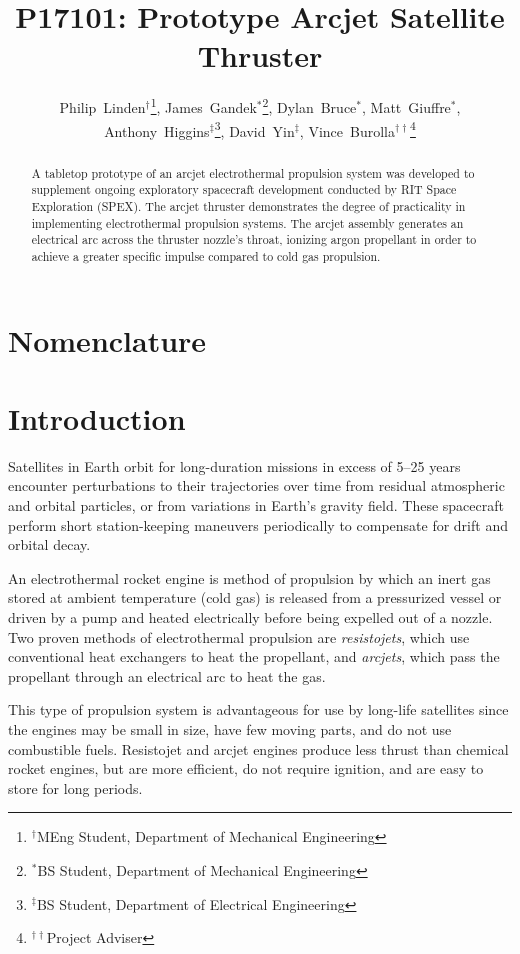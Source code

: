 \documentclass[journal]{IEEEtran}
\title{P17101: Prototype Arcjet Satellite Thruster}
\author{
  Philip~Linden$^{\dagger}$\thanks{$^{\dagger}$MEng Student, Department of Mechanical Engineering},
  James~Gandek$^{*}$\thanks{$^{*}$BS Student, Department of Mechanical Engineering},
  Dylan~Bruce$^{*}$,
  Matt~Giuffre$^{*}$,
  Anthony~Higgins$^{\ddagger}$\thanks{$^{\ddagger}$BS Student, Department of Electrical Engineering},
  David~Yin$^{\ddagger}$,
  Vince~Burolla$^{\dagger\dagger}$\thanks{$^{\dagger\dagger}$Project Adviser}
}
\begin{document}
\maketitle


\begin{abstract}
A tabletop prototype of an arcjet electrothermal propulsion system was developed to supplement ongoing exploratory spacecraft development conducted by RIT Space Exploration (SPEX). The arcjet thruster demonstrates the degree of practicality in implementing electrothermal propulsion systems. The arcjet assembly generates an electrical arc across the thruster nozzle's throat, ionizing argon propellant in order to achieve a greater specific impulse compared to cold gas propulsion.
\end{abstract}

\section{Nomenclature}
\label{sec:nomenclature}

\section{Introduction}
\label{sec:intro}
Satellites in Earth orbit for long-duration missions in excess of 5--25 years encounter perturbations to their trajectories over time from residual atmospheric and orbital particles, or from variations in Earth's gravity field.
These spacecraft perform short station-keeping maneuvers periodically to compensate for drift and orbital decay.

An electrothermal rocket engine is method of propulsion by which an inert gas stored at ambient temperature (cold gas) is released from a pressurized vessel or driven by a pump and heated electrically before being expelled out of a nozzle.
Two proven methods of electrothermal propulsion are \emph{resistojets}, which use conventional heat exchangers to heat the propellant, and \emph{arcjets}, which pass the propellant through an electrical arc to heat the gas.

This type of propulsion system is advantageous for use by long-life satellites since the engines may be small in size, have few moving parts, and do not use combustible fuels.
Resistojet and arcjet engines produce less thrust than chemical rocket engines, but are more efficient, do not require ignition, and are easy to store for long periods.
\end{document}
